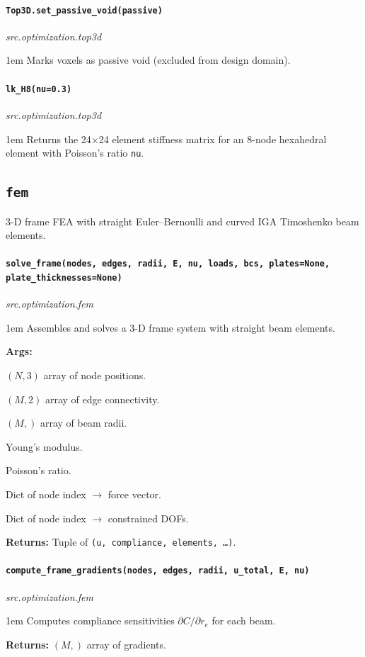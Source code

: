 \documentclass[a4paper, 11pt, openany]{report}
\newcommand{\apifunc}[2]{%
    \paragraph{\texttt{#2}}\hfill\textit{\small #1}\par\nopagebreak
}
\begin{document}
\apifunc{src.optimization.top3d}{Top3D.set\_passive\_void(passive)}
\begin{adjustwidth}{1em}{}
Marks voxels as passive void (excluded from design domain).
\end{adjustwidth}

\apifunc{src.optimization.top3d}{lk\_H8(nu=0.3)}
\begin{adjustwidth}{1em}{}
Returns the 24$\times$24 element stiffness matrix for an 8-node hexahedral
element with Poisson's ratio \texttt{nu}.
\end{adjustwidth}


\subsection{\texttt{fem}}

3-D frame FEA with straight Euler--Bernoulli and curved IGA Timoshenko beam
elements.

\apifunc{src.optimization.fem}{solve\_frame(nodes, edges, radii, E, nu, loads, bcs, plates=None, plate\_thicknesses=None)}
\begin{adjustwidth}{1em}{}
Assembles and solves a 3-D frame system with straight beam elements.

\textbf{Args:}
\begin{description}[nosep, labelwidth=3cm, leftmargin=3.5cm]
    \item[\texttt{nodes}] $(N, 3)$ array of node positions.
    \item[\texttt{edges}] $(M, 2)$ array of edge connectivity.
    \item[\texttt{radii}] $(M,)$ array of beam radii.
    \item[\texttt{E}] Young's modulus.
    \item[\texttt{nu}] Poisson's ratio.
    \item[\texttt{loads}] Dict of node index $\to$ force vector.
    \item[\texttt{bcs}] Dict of node index $\to$ constrained DOFs.
\end{description}

\textbf{Returns:} Tuple of \texttt{(u, compliance, elements, \ldots)}.
\end{adjustwidth}

\apifunc{src.optimization.fem}{compute\_frame\_gradients(nodes, edges, radii, u\_total, E, nu)}
\begin{adjustwidth}{1em}{}
Computes compliance sensitivities $\partial C / \partial r_e$ for each beam.

\textbf{Returns:} $(M,)$ array of gradients.
\end{adjustwidth}
\end{document}

